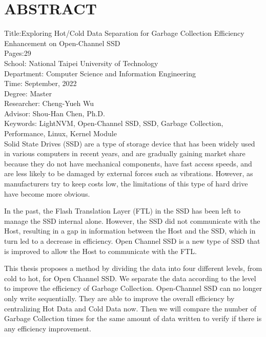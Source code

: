 \chapter*{ABSTRACT}


\noindent
Title:Exploring Hot/Cold Data Separation for Garbage Collection Efficiency Enhancement on Open-Channel SSD\\
Pages:29\\
School: National Taipei University of Technology\\
Department: Computer Science and Information Engineering\\
Time: September, 2022\\
Degree: Master\\
Researcher: Cheng-Yueh Wu\\
Advisor: Shou-Han Chen, Ph.D.\\
Keywords: LightNVM, Open-Channel SSD, SSD, Garbage Collection, Performance, Linux, Kernel Module\\

Solid State Drives (SSD) are a type of storage device that has been widely used in various computers in recent years, and are gradually gaining market share because they do not have mechanical components, have fast access speeds, and are less likely to be damaged by external forces such as vibrations. However, as manufacturers try to keep costs low, the limitations of this type of hard drive have become more obvious.

\indent
In the past, the Flash Translation Layer (FTL) in the SSD has been left to manage the SSD internal alone. However, the SSD did not communicate with the Host, resulting in a gap in information between the Host and the SSD, which in turn led to a decrease in efficiency. Open Channel SSD is a new type of SSD that is improved to allow the Host to communicate with the FTL.

\indent
This thesis proposes a method by dividing the data into four different levels, from cold to hot, for Open Channel SSD. We separate the data according to the level to improve the efficiency of Garbage Collection. Open-Channel SSD can no longer only write sequentially. They are able to improve the overall efficiency by centralizing Hot Data and Cold Data now. Then we will compare the number of Garbage Collection times for the same amount of data written to verify if there is any efficiency improvement.

